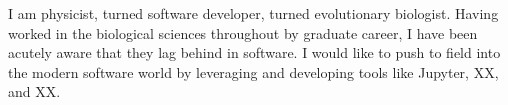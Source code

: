 

\begin{cvparagraph}


I am physicist, turned software developer, turned evolutionary biologist. Having worked in the biological sciences throughout by graduate career, I have been acutely aware that they lag behind in software. I would like to push to field into the modern software world by leveraging and developing tools like Jupyter, XX, and XX.

\end{cvparagraph}
